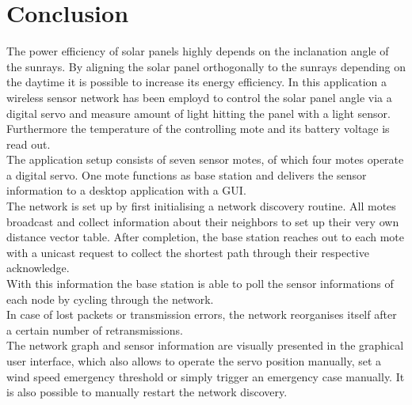 \documentclass[conference]{IEEEtran}
\begin{document}
\section{Conclusion}
The power efficiency of solar panels highly depends on the inclanation angle of the sunrays. By aligning the solar panel orthogonally to the sunrays depending on the daytime it is possible to increase its energy efficiency. In this application a wireless sensor network has been employd to control the solar panel angle via a digital servo and measure amount of light hitting the panel with a light sensor. Furthermore the temperature of the controlling mote and its battery voltage is read out.\\
The application setup consists of seven sensor motes, of which four motes operate a digital servo. One mote functions as base station and delivers the sensor information to a desktop application with a GUI.\\
The network is set up by first initialising a network discovery routine. All motes broadcast and collect information about their neighbors to set up their very own distance vector table. After completion, the base station reaches out to each mote with a unicast request to collect the shortest path through their respective acknowledge.\\
With this information the base station is able to poll the sensor informations of each node by cycling through the network.\\
In case of lost packets or transmission errors, the network reorganises itself after a certain number of retransmissions.\\
The network graph and sensor information are visually presented in the graphical user interface, which also allows to operate the servo position manually, set a wind speed emergency threshold or simply trigger an emergency case manually. It is also possible to manually restart the network discovery.\\










\end{document}
